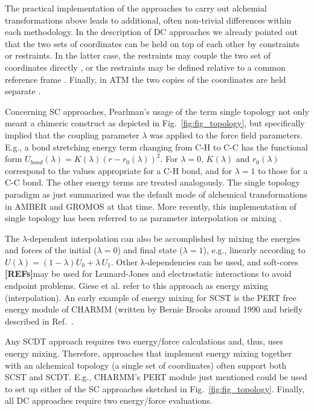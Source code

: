 \documentclass[9pt,bestpractices]{livecoms}
\newcommand{\rref}{{\bfseries[REFs]}{}}
\begin{document}
The practical implementation of the approaches to carry out alchemial transformations above leads to additional, often non-trivial differences within each methodology. In the description of DC approaches we already pointed out that the two sets of coordinates can be held on top of each other by constraints \cite{jiang2019computing,Lee_2023} or restraints. In the latter case, the restraints may couple the two set of coordinates directly \cite{Axelsen_1998,Ries_2022}, or the restraints may be defined relative to a common reference frame \cite{rocklin2013separated,Baumann_2023}. Finally, in ATM the two copies of the coordinates are held separate \cite{Azimi_2022}.

Concerning SC approaches, Pearlman’s usage of the term single topology not only meant a chimeric construct as depicted in Fig.~\ref{fig:fig_topology}, but specifically implied that the coupling parameter $\lambda$ was applied to the force field parameters. E.g., a bond stretching energy term changing from C-H to C-C has the functional form $U_{bond}(\lambda)=K(\lambda)(r-r_0(\lambda))^2$. For $\lambda=0$, $K(\lambda)$ and $r_0(\lambda)$ correspond to the values appropriate for a C-H bond, and for $\lambda=1$ to those for a C-C bond. The other energy terms are treated analogously. The single topology paradigm as just summarized was the default mode of alchemical transformations in AMBER and GROMOS at that time.  More recently, this implementation of single topology has been referred to as parameter interpolation or mixing \cite{Giese_2018}. 

The $\lambda$-dependent interpolation can also be accomplished by mixing the energies and forces of the initial ($\lambda=0$) and final state ($\lambda=1$), e.g., linearly according to $U(\lambda)=(1-\lambda) U_0+\lambda\,U_1$. Other λ-dependencies can be used, and soft-cores \rref may be used for Lennard-Jones and electrostatic interactions to avoid endpoint problems. Giese et al. \cite{Giese_2018} refer to this approach as energy mixing (interpolation).%
An early example of energy mixing for SCST is the PERT free energy module of CHARMM (written by Bernie Brooks around 1990 and briefly described in Ref.~\cite{brooks_2009}.

Any SCDT approach requires two energy/force calculations and, thus, uses energy mixing. Therefore, approaches that implement energy mixing together with an alchemical topology (a single set of coordinates) often support both SCST and SCDT. E.g., CHARMM's PERT module just mentioned could be used to set up either of the SC approaches sketched in Fig.~\ref{fig:fig_topology}. Finally, all DC approaches require two energy/force evaluations.
\end{document}
